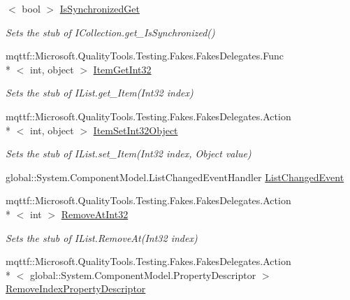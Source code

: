 \begin{DoxyCompactItemize}
$<$ bool $>$ \hyperlink{class_system_1_1_component_model_1_1_fakes_1_1_stub_i_binding_list_a2486e5d17cb69433af0fcf1b7f7c2005}{Is\-Synchronized\-Get}
\begin{DoxyCompactList}\small\item\em Sets the stub of I\-Collection.\-get\-\_\-\-Is\-Synchronized()\end{DoxyCompactList}\item 
mqttf\-::\-Microsoft.\-Quality\-Tools.\-Testing.\-Fakes.\-Fakes\-Delegates.\-Func\\*
$<$ int, object $>$ \hyperlink{class_system_1_1_component_model_1_1_fakes_1_1_stub_i_binding_list_a26255672991ad079033fefed5aab3520}{Item\-Get\-Int32}
\begin{DoxyCompactList}\small\item\em Sets the stub of I\-List.\-get\-\_\-\-Item(\-Int32 index)\end{DoxyCompactList}\item 
mqttf\-::\-Microsoft.\-Quality\-Tools.\-Testing.\-Fakes.\-Fakes\-Delegates.\-Action\\*
$<$ int, object $>$ \hyperlink{class_system_1_1_component_model_1_1_fakes_1_1_stub_i_binding_list_ad962ab775192d374190883a53ddce96d}{Item\-Set\-Int32\-Object}
\begin{DoxyCompactList}\small\item\em Sets the stub of I\-List.\-set\-\_\-\-Item(\-Int32 index, Object value)\end{DoxyCompactList}\item 
global\-::\-System.\-Component\-Model.\-List\-Changed\-Event\-Handler \hyperlink{class_system_1_1_component_model_1_1_fakes_1_1_stub_i_binding_list_afbd059ed51f1da52f61dad7d2fb424a6}{List\-Changed\-Event}
\item 
mqttf\-::\-Microsoft.\-Quality\-Tools.\-Testing.\-Fakes.\-Fakes\-Delegates.\-Action\\*
$<$ int $>$ \hyperlink{class_system_1_1_component_model_1_1_fakes_1_1_stub_i_binding_list_a776f7e55c2d56d8658371fa724eb9ffc}{Remove\-At\-Int32}
\begin{DoxyCompactList}\small\item\em Sets the stub of I\-List.\-Remove\-At(\-Int32 index)\end{DoxyCompactList}\item 
mqttf\-::\-Microsoft.\-Quality\-Tools.\-Testing.\-Fakes.\-Fakes\-Delegates.\-Action\\*
$<$ global\-::\-System.\-Component\-Model.\-Property\-Descriptor $>$ \hyperlink{class_system_1_1_component_model_1_1_fakes_1_1_stub_i_binding_list_a785cca67b49da07729f23cf171b95717}{Remove\-Index\-Property\-Descriptor}

\end{DoxyCompactItemize}
